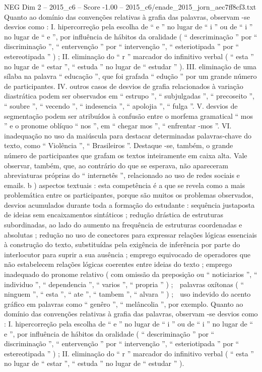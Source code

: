 \begin{textsample}{NEG Dim 2 – 2015\_c6 – Score -1.00 – 2015\_c6/enade\_2015\_jorn\_aec7ff8cf3.txt}
Quanto ao domínio das convenções relativas à grafia das palavras, observam -se desvios como : I. hipercorreção pela escolha de “ e ” no lugar de “ i ” ou de “ i ” no lugar de “ e ”, por influência de hábitos da oralidade ( “ descriminação ” por “ discriminação ”, “ entervenção ” por “ intervenção ”, “ esteriotipada ” por “ estereotipada ” ) ; II. eliminação do “ r ” marcador do infinitivo verbal ( “ esta ” no lugar de “ estar ”, “ estuda ” no lugar de “ estudar ” ).
III. eliminação de uma sílaba na palavra “ educação ”, que foi grafada “ edução ” por um grande número de participantes.
IV. outros casos de desvios de grafia relacionados à variação diastrática podem ser observados em “ estrupo ”, “ subjulgadas ”, “ precoseito ”, “ soubre ”, “ vecendo ”, “ indesencia ”, “ apolojia ”, “ fulga ”.
V. desvios de segmentação podem ser atribuídos à confusão entre o morfema gramatical “ mos ” e o pronome oblíquo “ nos ”, em “ chegar mos ”, “ enfrentar -mos ”.
VI. inadequação no uso da maiúscula para destacar determinadas palavras-chave do texto, como “ Violência ”, “ Brasileiros ”.
Destaque -se, também, o grande número de participantes que grafam os textos inteiramente em caixa alta.
Vale observar, também, que, ao contrário do que se esperava, não apareceram abreviaturas próprias do “ internetês ”, relacionado ao uso de redes sociais e emails. b ) aspectos textuais : esta competência é a que se revela como a mais problemática entre os participantes, porque são muitos os problemas observados, desvios acumulados durante toda a formação do estudante : sequência justaposta de ideias sem encaixamentos sintáticos ; redução drástica de estruturas subordinadas, ao lado do aumento na frequência de estruturas coordenadas e absolutas ; redução no uso de conectores para expressar relações lógicas essenciais à construção do texto, substituídas pela exigência de inferência por parte do interlocutor para suprir a sua ausência ; emprego equivocado de operadores que não estabelecem relações lógicas coerentes entre ideias do texto ; emprego inadequado do pronome relativo ( com omissão da preposição ou “ noticiarios ”, “ individuo ”, “ dependencia ”, “ varios ”, “ propria ” ) ;  palavras oxítonas ( “ ninguem ”, “ esta ”, “ ate ”, “ tambem ”, “ alvara ” ) ;  uso indevido do acento gráfico em palavras como “ genêro ”, “ melâncolia ”, por exemplo.
Quanto ao domínio das convenções relativas à grafia das palavras, observam -se desvios como : I. hipercorreção pela escolha de “ e ” no lugar de “ i ” ou de “ i ” no lugar de “ e ”, por influência de hábitos da oralidade ( “ descriminação ” por “ discriminação ”, “ entervenção ” por “ intervenção ”, “ esteriotipada ” por “ estereotipada ” ) ; II. eliminação do “ r ” marcador do infinitivo verbal ( “ esta ” no lugar de “ estar ”, “ estuda ” no lugar de “ estudar ” ).

\end{textsample}
